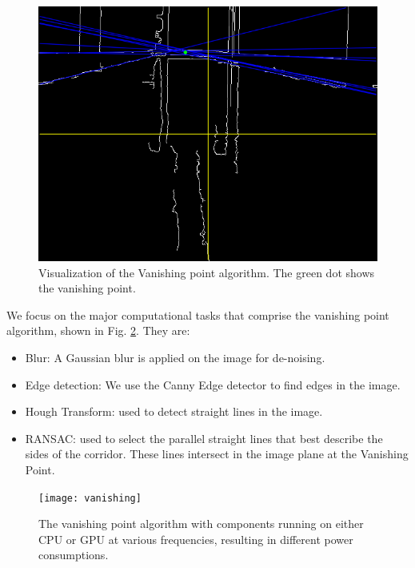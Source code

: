 \begin{figure}[hbtp]
\centering
\includegraphics[scale=0.26]{Figs/image_176.png}
\caption{Visualization of the Vanishing point algorithm. The green dot shows the vanishing point.}
\label{fig:vp_viz} %
\end{figure}



We focus on the major computational tasks that comprise the vanishing point algorithm, shown in Fig. \ref{fig:vanishing}.
They are:

\begin{itemize}
\item Blur: A Gaussian blur is applied on the image for de-noising.
\item Edge detection: We use the Canny Edge detector to find edges in the image.
\item Hough Transform: used to detect straight lines in the image.
\item RANSAC: used to select the parallel straight lines that best describe the sides of the corridor. These lines intersect in the image plane at the Vanishing Point.
\end{itemize}

\begin{figure}
	\centering
	\texttt{[image: vanishing]}
	\caption{The vanishing point algorithm with components running on either CPU or GPU at various frequencies, resulting in different power consumptions.}
	\label{fig:vanishing}		
\end{figure}
